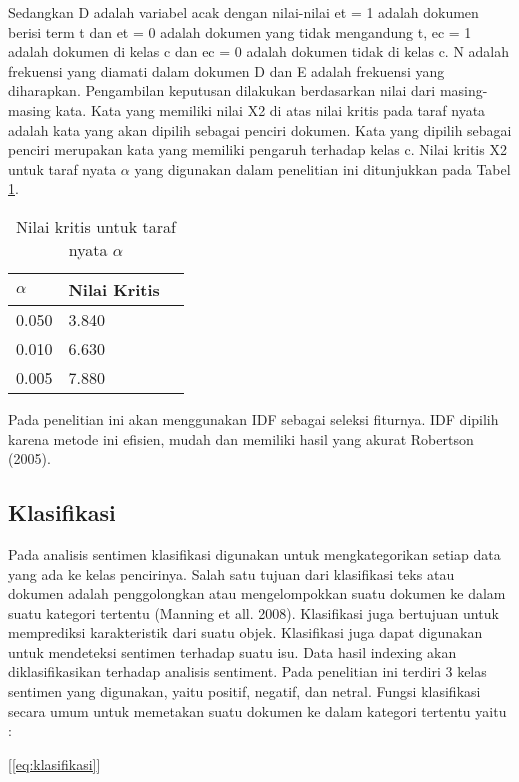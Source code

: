 Sedangkan D adalah variabel acak dengan nilai-nilai et = 1 adalah dokumen berisi term t dan et = 0 adalah dokumen yang tidak mengandung t, ec = 1 adalah dokumen di kelas c dan ec = 0 adalah dokumen tidak di kelas c. N adalah frekuensi yang diamati dalam dokumen D dan E adalah frekuensi yang diharapkan. Pengambilan keputusan dilakukan berdasarkan nilai dari masing-masing kata. Kata yang memiliki nilai X2 di atas nilai kritis pada taraf nyata adalah kata yang akan dipilih sebagai penciri dokumen. Kata yang dipilih sebagai penciri merupakan kata yang memiliki pengaruh terhadap kelas c. Nilai kritis  X2  untuk taraf nyata $\alpha$ yang digunakan dalam penelitian ini ditunjukkan pada Tabel  \ref{tab:chisquare}.

\begin{table}[hbt]
	\caption{Nilai kritis untuk taraf nyata $\alpha$}
	\centering
	\begin{tabular}{llr}
		\toprule
		$\alpha$ & Nilai Kritis \\
		\midrule
		0.050 & 3.840 \\
		0.010 & 6.630 \\
		0.005 & 7.880 \\
		\bottomrule
	\end{tabular}
	\label{tab:chisquare}
\end{table}

Pada penelitian ini akan menggunakan IDF sebagai seleksi fiturnya. IDF dipilih karena metode ini efisien, mudah dan memiliki hasil yang akurat Robertson (2005).

\subsection*{Klasifikasi}
Pada analisis sentimen klasifikasi digunakan untuk mengkategorikan setiap data yang ada ke kelas pencirinya. Salah satu tujuan dari klasifikasi teks atau dokumen adalah penggolongkan atau mengelompokkan suatu dokumen ke dalam suatu kategori tertentu
(Manning et all. 2008). Klasifikasi juga bertujuan untuk memprediksi karakteristik dari suatu objek. Klasifikasi juga dapat digunakan untuk mendeteksi sentimen terhadap suatu isu. Data hasil indexing akan diklasifikasikan terhadap analisis sentiment. Pada penelitian ini terdiri 3 kelas sentimen yang digunakan, yaitu positif, negatif, dan netral. Fungsi klasifikasi secara umum untuk memetakan suatu dokumen ke dalam kategori tertentu yaitu :

[\ref{eq:klasifikasi}]

